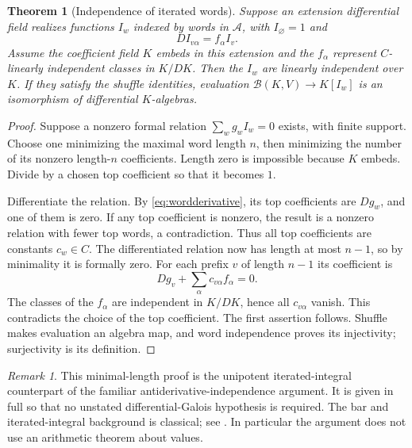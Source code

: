 \documentclass[11pt]{article}
\numberwithin{equation}{section}
\newtheorem{theorem}{Theorem}[section]
\theoremstyle{definition}
\theoremstyle{remark}
\newtheorem{remark}[remark]{Remark}
\newcommand{\calB}{\mathcal B}
\newcommand{\emptyword}{\varnothing}
\begin{document}
\begin{theorem}[Independence of iterated words]\label{thm:wordind}
Suppose an extension differential field realizes functions $I_w$ indexed by
words in $\mathscr A$, with $I_{\emptyword}=1$ and
\begin{equation}\label{eq:wordderivative}
 D I_{v\alpha}=f_\alpha I_v.
\end{equation}
Assume the coefficient field $K$ embeds in this extension and the
$f_\alpha$ represent $C$-linearly independent classes in $K/DK$.
Then the $I_w$ are linearly independent over $K$.
If they satisfy the shuffle identities, evaluation
$\calB(K,V)\to K[I_w]$ is an isomorphism of differential $K$-algebras.
\end{theorem}
\begin{proof}
Suppose a nonzero formal relation $\sum_wg_wI_w=0$ exists, with finite
support. Choose one minimizing the maximal word length $n$, then minimizing
the number of its nonzero length-$n$ coefficients. Length zero is impossible
because $K$ embeds. Divide by a chosen top coefficient so that it becomes $1$.

Differentiate the relation. By \eqref{eq:wordderivative}, its top coefficients
are $Dg_w$, and one of them is zero. If any top coefficient is nonzero, the
result is a nonzero relation with fewer top words, a contradiction. Thus all
top coefficients are constants $c_w\in C$. The differentiated relation now
has length at most $n-1$, so by minimality it is formally zero. For each
prefix $v$ of length $n-1$ its coefficient is
\[
 Dg_v+\sum_{\alpha}c_{v\alpha}f_\alpha=0.
\]
The classes of the $f_\alpha$ are independent in $K/DK$, hence all
$c_{v\alpha}$ vanish. This contradicts the choice of the top coefficient.
The first assertion follows. Shuffle makes evaluation an algebra map, and
word independence proves its injectivity; surjectivity is its definition.
\end{proof}

\begin{remark}
This minimal-length proof is the unipotent iterated-integral counterpart of
the familiar antiderivative-independence argument. It is given in full so that
no unstated differential-Galois hypothesis is required. The bar and
iterated-integral background is classical; see \cite{Chen1977,Brown2009}.
In particular the argument does not use an arithmetic theorem about values.
\end{remark}
\end{document}
